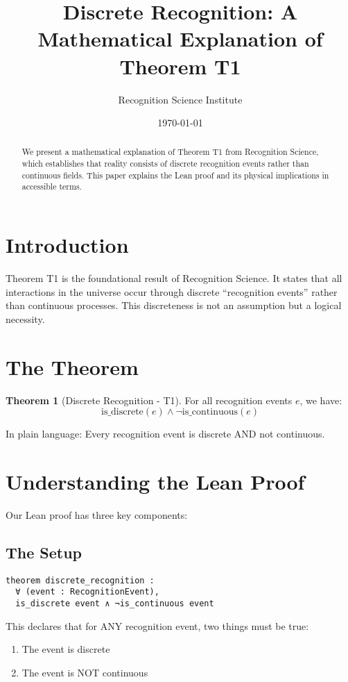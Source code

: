 \documentclass[11pt]{article}
\title{Discrete Recognition: A Mathematical Explanation of Theorem T1}
\author{Recognition Science Institute}
\date{\today}
\theoremstyle{definition}
\newtheorem{theorem}{Theorem}
\begin{document}
\maketitle

\begin{abstract}
We present a mathematical explanation of Theorem T1 from Recognition Science, which establishes that reality consists of discrete recognition events rather than continuous fields. This paper explains the Lean proof and its physical implications in accessible terms.
\end{abstract}

\section{Introduction}

Theorem T1 is the foundational result of Recognition Science. It states that all interactions in the universe occur through discrete ``recognition events'' rather than continuous processes. This discreteness is not an assumption but a logical necessity.

\section{The Theorem}

\begin{theorem}[Discrete Recognition - T1]
For all recognition events $e$, we have:
$$\text{is\_discrete}(e) \land \neg\text{is\_continuous}(e)$$
\end{theorem}

In plain language: Every recognition event is discrete AND not continuous.

\section{Understanding the Lean Proof}

Our Lean proof has three key components:

\subsection{The Setup}
\begin{verbatim}
theorem discrete_recognition : 
  ∀ (event : RecognitionEvent), 
  is_discrete event ∧ ¬is_continuous event
\end{verbatim}

This declares that for ANY recognition event, two things must be true:
\begin{enumerate}
    \item The event is discrete
    \item The event is NOT continuous
\end{enumerate}
\end{document}

